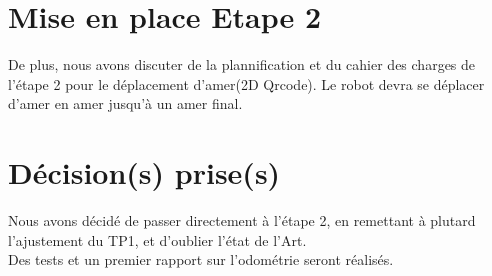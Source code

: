 \documentclass[a4wide,10pt]{article}
\begin{document}
\section*{Mise en place Etape 2}

De plus, nous avons discuter de la plannification et du cahier des charges de l'étape 2 pour le déplacement d'amer(2D Qrcode). Le robot devra se déplacer d'amer en amer jusqu'à un amer final.


\section*{Décision(s) prise(s)}

Nous avons décidé de passer directement à l'étape 2, en remettant à plutard l'ajustement du TP1, et d'oublier l'état de l'Art.\\
Des tests et un premier rapport sur l'odométrie seront réalisés.


\subsection*{\color{red}{Prochaine réunion : Vendredi 20 janvier 2017 (14h-15h)}}
\end{document}
